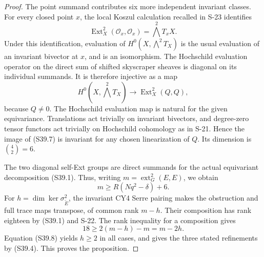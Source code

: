 \documentclass[11pt,a4paper]{article}
\theoremstyle{definition}
\begin{document}
\begin{proof}
The point summand contributes six more independent invariant classes.
For every closed point $x$, the local Koszul calculation recalled in S-23
identifies
\[
 \operatorname{Ext}^2_X(\mathcal O_x,\mathcal O_x)
      =\bigwedge^2T_xX.
\]
Under this identification, evaluation of
$H^0(X,\bigwedge^2T_X)$ is the usual evaluation of an invariant bivector
at $x$, and is an isomorphism. The Hochschild evaluation operator on the direct sum of shifted
skyscraper sheaves is diagonal on its individual summands. It is therefore
injective as a map
\[
 H^0(X,\bigwedge^2T_X)\longrightarrow
            \operatorname{Ext}^2_X(Q,Q),
 \tag{S39.7}
\]
because $Q\ne0$. The Hochschild evaluation map is natural for the given
equivariance. Translations act trivially on invariant bivectors, and
degree-zero tensor functors act trivially on Hochschild cohomology as in
S-21. Hence the image of (S39.7) is invariant for any chosen linearization
of $Q$. Its dimension is $\binom42=6$.

The two diagonal self-Ext groups are direct summands for the actual
equivariant decomposition (S39.1). Thus, writing
$m=\operatorname{ext}^2_G(E,E)$, we obtain
\[
 m\ge R(Nq^2-\delta)+6.
 \tag{S39.8}
\]
For $h=\dim\ker\sigma^2_{\widetilde E}$, the invariant CY4 Serre
pairing makes the obstruction and full trace maps transpose, of common
rank $m-h$. Their composition has rank eighteen by (S39.1) and S-22.
The rank inequality for a composition gives
\[
 18\ge2(m-h)-m=m-2h.
\]
Equation (S39.8) yields $h\ge2$ in all cases, and gives the three stated
refinements by (S39.4). This proves the proposition.
\end{proof}
\end{document}
